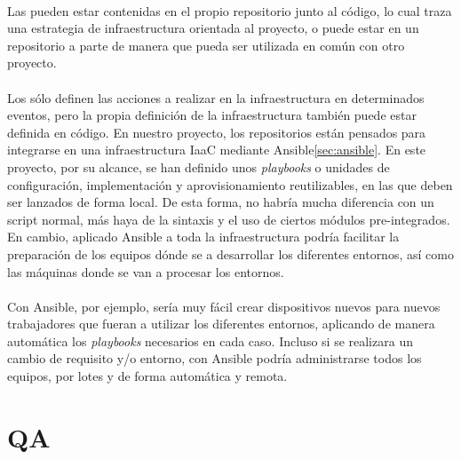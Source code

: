 \paragraph{}Las  pueden estar contenidas en el propio repositorio
junto al código, lo cual traza una estrategia de infraestructura orientada al proyecto,
o puede estar en un repositorio a parte de manera que pueda ser utilizada en común con
otro proyecto.

\paragraph{}Los  sólo definen las acciones a realizar en la infraestructura
en determinados eventos, pero la propia definición de la infraestructura también puede
estar definida en código. En nuestro proyecto, los repositorios están pensados para
integrarse en una infraestructura \gls{IaaC} mediante Ansible\ref{sec:ansible}. En este
proyecto, por su alcance, se han definido unos \emph{playbooks} o unidades de configuración,
implementación y aprovisionamiento reutilizables, en las que deben ser lanzados de forma
local. De esta forma, no habría mucha diferencia con un script normal, más haya de la
sintaxis y el uso de ciertos módulos pre-integrados. En cambio, aplicado Ansible a toda
la infraestructura podría facilitar la preparación de los equipos dónde se a desarrollar
los diferentes entornos, así como las máquinas donde se van a procesar los entornos.

\paragraph{}Con Ansible, por ejemplo, sería muy fácil crear dispositivos nuevos para
nuevos trabajadores que fueran a utilizar los diferentes entornos, aplicando de manera
automática los \emph{playbooks} necesarios en cada caso. Incluso si se realizara un
cambio de requisito y/o entorno, con Ansible podría administrarse todos los equipos,
por lotes y de forma automática y remota.

\section{QA}

